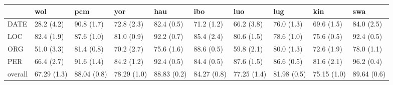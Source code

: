 \begin{tabular}{llllllllll}
\toprule
{} &          wol &          pcm &          yor &          hau &          ibo &          luo &          lug &          kin &          swa \\
\midrule
DATE    &   28.2 (4.2) &   90.8 (1.7) &   72.8 (2.3) &   82.4 (0.5) &   71.2 (1.2) &   66.2 (3.8) &   76.0 (1.3) &   69.6 (1.5) &   84.0 (2.5) \\
LOC     &   82.4 (1.9) &   87.6 (1.0) &   81.0 (0.9) &   92.2 (0.7) &   85.4 (2.4) &   80.6 (1.5) &   78.6 (1.0) &   75.6 (0.5) &   92.4 (0.5) \\
ORG     &   51.0 (3.3) &   81.4 (0.8) &   70.2 (2.7) &   75.6 (1.6) &   88.6 (0.5) &   59.8 (2.1) &   80.0 (1.3) &   72.6 (1.9) &   78.0 (1.1) \\
PER     &   66.4 (2.7) &   91.6 (1.4) &   84.2 (1.2) &   92.4 (0.5) &   84.4 (0.5) &   87.6 (1.5) &   86.6 (0.5) &   81.6 (2.1) &   96.2 (0.4) \\
overall &  67.29 (1.3) &  88.04 (0.8) &  78.29 (1.0) &  88.83 (0.2) &  84.27 (0.8) &  77.25 (1.4) &  81.98 (0.5) &  75.15 (1.0) &  89.64 (0.6) \\
\bottomrule
\end{tabular}
